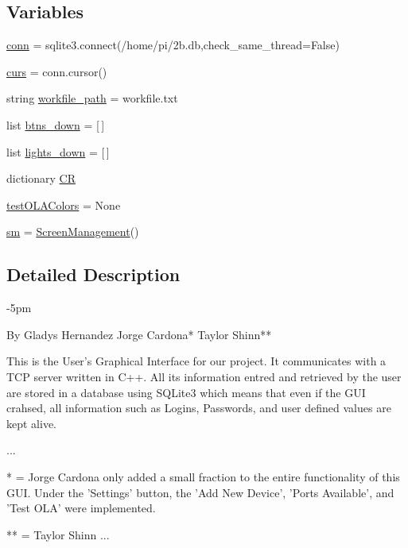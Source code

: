 \subsection*{Variables}
\begin{DoxyCompactItemize}
\item 
\hyperlink{namespaceGUI8_a49010b9a16980db6e87f54580689492d}{conn} = sqlite3.\+connect(\textquotesingle{}/home/pi/2b.\+db\textquotesingle{},check\+\_\+same\+\_\+thread=\+False)
\item 
\hyperlink{namespaceGUI8_a9d14617d09e50247fc7d7b65ea35c514}{curs} = conn.\+cursor()
\item 
string \hyperlink{namespaceGUI8_a6292bd16380bb1ee0c304104f3360d88}{workfile\+\_\+path} = \textquotesingle{}workfile.\+txt\textquotesingle{}
\item 
list \hyperlink{namespaceGUI8_ad654a4cc579f4fa13d6c2e88100e51e7}{btns\+\_\+down} = \mbox{[}$\,$\mbox{]}
\item 
list \hyperlink{namespaceGUI8_ad7496b54dfb9e4694dd3d0185d232526}{lights\+\_\+down} = \mbox{[}$\,$\mbox{]}
\item 
dictionary \hyperlink{namespaceGUI8_ac8f0ade69b245f322c069be72b159d1b}{CR}
\item 
\hyperlink{namespaceGUI8_a9452e2e26352526a966150d962e784e7}{test\+O\+L\+A\+Colors} = None
\item 
\hyperlink{namespaceGUI8_aa76ce78e0e5cc6e178b5745dae6ee144}{sm} = \hyperlink{classGUI8_1_1ScreenManagement}{Screen\+Management}()
\end{DoxyCompactItemize}


\subsection{Detailed Description}
-\/5pm 

\begin{DoxyVerb}By Gladys Hernandez
   Jorge Cardona*
   Taylor Shinn**

This is the User's Graphical Interface for our project.
It communicates with a TCP server written in C++.
All its information entred and retrieved by the user
are stored in a database using SQLite3 which means that even
if the GUI crahsed, all information such as Logins, Passwords, and
user defined values are kept alive.

...

* = Jorge Cardona only added a small fraction to the entire functionality 
of this GUI. Under the 'Settings' button, the 'Add New Device', 'Ports Available',
and 'Test OLA' were implemented.

** = Taylor Shinn ...\end{DoxyVerb}


